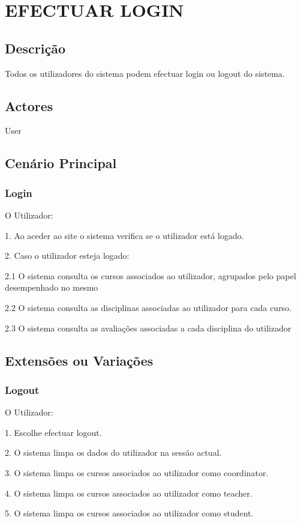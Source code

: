 \section{EFECTUAR LOGIN}
\subsection{Descrição}
Todos os utilizadores do sistema podem efectuar login ou logout do sistema. 

\subsection{Actores}
User

\subsection{Cenário Principal}
 
\subsubsection{Login}
O Utilizador:

1. Ao aceder ao site o sistema verifica se o utilizador está logado.

2. Caso o utilizador esteja logado:

2.1 O sistema consulta os cursos associados ao utilizador, agrupados pelo papel desempenhado no mesmo

2.2 O sistema consulta as disciplinas associadas ao utilizador para cada curso.

2.3 O sistema consulta as avaliações associadas a cada disciplina do utilizador

\subsection{Extensões ou Variações} 


\subsubsection{Logout}

O Utilizador:

1. Escolhe efectuar logout.

2. O sistema limpa os dados do utilizador na sessão actual.

3. O sistema limpa os cursos associados ao utilizador como coordinator.

4. O sistema limpa os cursos associados ao utilizador como teacher.

5. O sistema limpa os cursos associados ao utilizador como student.